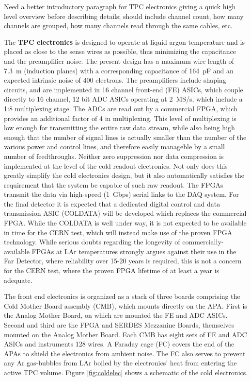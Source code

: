 {\color{red} Need a better introductory paragraph for TPC electronics giving a quick high level overview before describing details; should include channel count, how many channels are grouped, how many channels read through the same cables, etc.}

The {\bf TPC electronics} is designed to operate at liquid argon temperature and is placed as close to the sense wires as possible,
thus minimizing the capacitance and the preamplifier noise.
The present design has a maximum wire length of 7.3~m (induction planes)
with a corresponding capacitance of 164~pF and an expected intrinsic noise of 400 electrons.
The preamplifiers include shaping circuits, and are implemented in 16 channel front-end (FE) ASICs,
which couple directly to 16 channel, 12 bit ADC ASICs operating at 2~MS/s, which include a 1:8 multiplexing stage.
The ADCs are read out by a commercial FPGA, which provides an additional factor of 4 in multiplexing.
This level of multiplexing is low enough for transmitting the entire raw data stream,
while also being high enough that the number of signal lines is actually smaller than the number of the various
power and control lines, and therefore easily manageble by a small number of feedthroughs.
Neither zero suppression nor data compression is implemented at the level of the cold readout electronics.
Not only does this greatly simplify the cold electronics design,
but it also automatically satisfies the requirement that the system be capable of such raw readout.
The FPGAs transmit the data via high-speed (1~Gbps) serial links to the DAQ system.
For the final detector it is expected that a dedicated digital control and data transmission ASIC (COLDATA) will be developed which
replaces the commercial FPGA.
While the COLDATA is well under way, it is not expected to be available in time for the CERN test,
which will instead make use of the proven FPGA technology.
While serious doubts regarding the longevity of commercially-available FPGAs at LAr temperatures strongly argues against
their use in the Far Detector, where reliability over 15-20 years is required,
this is not a concern for the CERN test, where the proven FPGA lifetime of at least a year is adequate.

The front end electronics is organized as a stack of three boards comprising the Cold Mother Board assembly (CMB),
which mounts directly on the APA.
First is the Analog Mother Board, on which are mounted the FE and ADC ASICs.
Second and third are the FPGA and SERDES Mezzanine Boards, themselves mounted on the Analog Mother Board.
Each CMB has eight sets of FE and ADC ASICs and instruments 128 wires.
A Faraday cage (FC) covers the end of the APAs to shield the electronics from ambient noise.
The FC also serves to prevent any Ar gas-bubbles from LAr boiled by the electronics' heat from entering the active TPC volume.
Figure \ref{fig:coldelec} shows a schematic of the cold electronics. 

